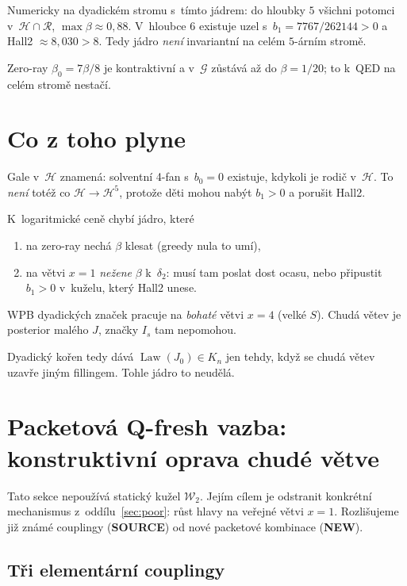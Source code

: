 \documentclass[11pt,a4paper]{article}
\theoremstyle{definition}
\theoremstyle{remark}
\newcommand{\Law}{\operatorname{Law}}
\newcommand{\cG}{\mathcal G}
\newcommand{\cH}{\mathcal H}
\newcommand{\cR}{\mathcal R}
\newcommand{\cW}{\mathcal W}
\begin{document}
Numericky na dyadickém stromu s~tímto jádrem: do hloubky \(5\) všichni potomci v~\(\cH\cap\cR\),
\(\max\beta\approx 0{,}88\). V~hloubce \(6\) existuje uzel s~\(b_1=7767/262144>0\) a Hall2 \(\approx 8{,}030>8\).
Tedy jádro \emph{není} invariantní na celém \(5\)-árním stromě.

Zero-ray \(\beta_0=7\beta/8\) je kontraktivní a v~\(\cG\) zůstává až do \(\beta=1/20\); to k~QED na celém stromě nestačí.

\section{Co z toho plyne}

Gale v~\(\cH\) znamená: solventní 4-fan s~\(b_0=0\) existuje, kdykoli je rodič v~\(\cH\).
To \emph{není} totéž co \(\cH\to\cH^5\), protože děti mohou nabýt \(b_1>0\) a porušit Hall2.

K~logaritmické ceně chybí jádro, které
\begin{enumerate}[leftmargin=1.4em]
\item na zero-ray nechá \(\beta\) klesat (greedy nula to umí),
\item na větvi \(x=1\) \emph{nežene} \(\beta\) k~\(\delta_2\):
      musí tam poslat dost ocasu, nebo připustit \(b_1>0\) v~kuželu, který Hall2 unese.
\end{enumerate}
WPB dyadických značek pracuje na \emph{bohaté} větvi \(x=4\) (velké \(S\)).
Chudá větev je posterior malého \(J\), značky \(I_s\) tam nepomohou.

Dyadický kořen tedy dává \(\Law(J_0)\in K_n\) jen tehdy, když se chudá větev uzavře jiným fillingem.
Tohle jádro to neudělá.


\section{Packetov\'a Q-fresh vazba: konstruktivn\'i oprava chud\'e v\v etve}
\label{sec:packet}

Tato sekce nepou\v z\'iv\'a statick\'y ku\v zel $\cW_2$.
Jej\'im c\'ilem je odstranit konkr\'etn\'i mechanismus z~odd\'ilu~\ref{sec:poor}:
r\r ust hlavy na ve\v rejn\'e v\v etvi $x=1$.
Rozli\v sujeme ji\v z zn\'am\'e couplingy (\textbf{SOURCE}) od nov\'e packetov\'e
kombinace (\textbf{NEW}).

\subsection{T\v ri element\'arn\'i couplingy}
\end{document}
